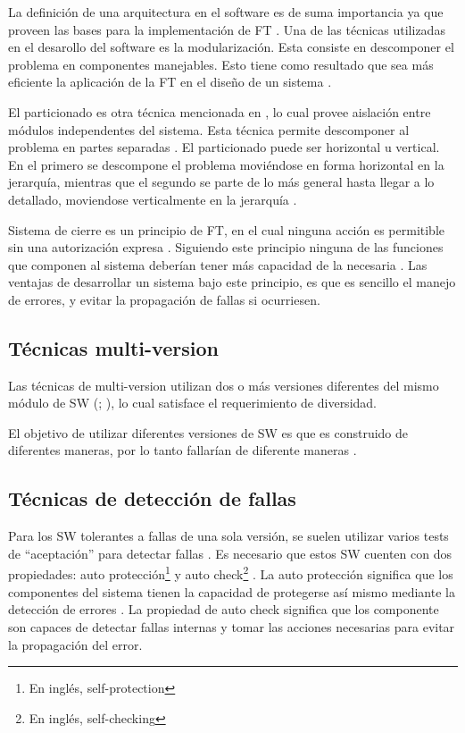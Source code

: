 La definición de una arquitectura en el software es de suma importancia ya que proveen las bases para 
la implementación de \ac{FT} \citep{SoftwareFaultToleranceATutorial}. Una de las técnicas utilizadas 
en el desarollo del software es la modularización. Esta consiste en descomponer el problema en 
componentes manejables. Esto tiene como resultado que sea más eficiente la aplicación de la \ac{FT} 
en el diseño de un sistema \citep{SoftwareFaultToleranceATutorial}. 

El particionado es otra técnica mencionada en \cite{SoftwareFaultToleranceATutorial}, lo cual 
provee aislación entre módulos independentes del sistema. Esta técnica permite descomponer al 
problema en partes separadas \citep{pressman01}. El particionado puede ser horizontal u 
vertical. En el primero se descompone el problema moviéndose en forma horizontal en la jerarquía, 
mientras que el segundo se parte de lo más general hasta llegar a lo detallado, moviendose 
verticalmente en la jerarquía \citep{pressman01}. 

Sistema de cierre es un principio de \ac{FT}, en el cual ninguna acción es permitible sin una 
autorización expresa \citep{SoftwareFaultToleranceATutorial}. Siguiendo este principio ninguna de 
las funciones que componen al sistema deberían tener más capacidad de la necesaria 
\citep{SoftwareFaultToleranceATutorial}. Las ventajas de desarrollar un sistema bajo este principio, 
es que es sencillo el manejo de errores, y evitar la propagación de fallas si ocurriesen. 

\subsection{Técnicas multi-version}
Las técnicas de multi-version utilizan dos o más versiones diferentes del mismo módulo de \ac{SW} 
(\citep{FTDesign}; \citep{SoftwareFaultToleranceATutorial}), lo cual satisface el requerimiento de 
diversidad. 

El objetivo de utilizar diferentes versiones de \ac{SW} es que es construido de diferentes 
maneras, por lo tanto fallarían de diferente maneras \citep{SoftwareFaultToleranceATutorial}.

\subsection{Técnicas de detección de fallas}
Para los \ac{SW} tolerantes a fallas de una sola versión, se suelen utilizar varios tests de 
``aceptación'' para detectar fallas \citep{FTDesign}. Es necesario que estos \ac{SW} cuenten con 
dos propiedades: auto protección\footnote{En inglés, self-protection} y auto check\footnote{En 
inglés, self-checking} \citep{SoftwareFaultToleranceATutorial}. La auto protección significa que  
los componentes del sistema tienen la capacidad de protegerse así mismo mediante la detección de 
errores \citep{SoftwareFaultToleranceATutorial}. La propiedad de auto check significa que los 
componente son capaces de detectar fallas internas y tomar las acciones necesarias para evitar la 
propagación del error. 

